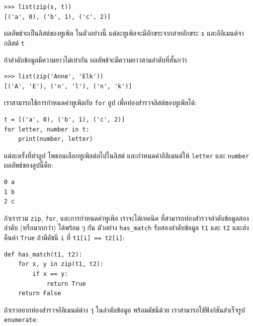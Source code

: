 \begin{verbatim}
>>> list(zip(s, t))
[('a', 0), ('b', 1), ('c', 2)]
\end{verbatim}
%
%
ผลลัพธ์จะเป็นลิสต์ของทูเพิล
ในตัวอย่างนี้ แต่ละทูเพิลจะมีอักขระจากสายอักขระ \texttt{s}
และอิลิเมนต์จากลิสต์ \texttt{t}
%

%
ถ้าลำดับข้อมูลมีความยาวไม่เท่ากัน
ผลลัพธ์จะมีความยาวตามลำดับที่สั้นกว่า


\begin{verbatim}
>>> list(zip('Anne', 'Elk'))
[('A', 'E'), ('n', 'l'), ('n', 'k')]
\end{verbatim}
%
%
เราสามารถใช้การกำหนดค่าทูเพิลกับ \texttt{for} ลูป เพื่อท่องสำรวจลิสต์ของทูเพิลได้:

\begin{verbatim}
t = [('a', 0), ('b', 1), ('c', 2)]
for letter, number in t:
    print(number, letter)
\end{verbatim}
%
%
แต่ละครั้งที่ทำลูป ไพธอนเลือกทูเพิลต่อไปในลิสต์
และกำหนดค่าอิลิเมนต์ให้ \texttt{letter} และ \texttt{number}
ผลลัพธ์ของลูปนี้คือ:

\begin{verbatim}
0 a
1 b
2 c
\end{verbatim}
%
%
ถ้าเรารวม \texttt{zip}, \texttt{for}, และการกำหนดค่าทูเพิล
เราจะได้เทคนิค ที่สามารถท่องสำรวจลำดับข้อมูลสองลำดับ (หรือมากกว่า) ได้พร้อม ๆ กัน
ตัวอย่าง \verb|has_match| รับสองลำดับข้อมูล \texttt{t1} และ \texttt{t2} และส่งคืนค่า \texttt{True} ถ้ามีดัชนี \texttt{i} 
ที่ \texttt{t1[i] == t2[i]}:
%

\begin{verbatim}
def has_match(t1, t2):
    for x, y in zip(t1, t2):
        if x == y:
            return True
    return False
\end{verbatim}
%
%
ถ้าเราอยากท่องสำรวจอิลิเมนต์ต่าง ๆ ในลำดับข้อมูล
พร้อมดัชนีด้วย
เราสามารถใช้ฟังก์ชันสำเร็จรูป \texttt{enumerate}:

